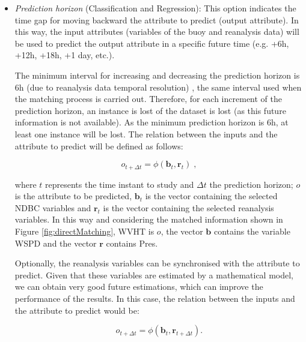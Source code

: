 \documentclass[energies,article,submit,moreauthors,pdftex]{Definitions/mdpi}
\begin{document}
					\begin{itemize}[leftmargin=*,labelsep=5.8mm]

						\item \textit{Prediction horizon} (Classification and Regression): This option indicates the time gap for moving backward the attribute to predict (output attribute). In this way, the input attributes (variables of the buoy and reanalysis data) will be used to predict the output attribute in a specific future time (e.g. +6h, +12h, +18h, +1 day, etc.).
						
						The minimum interval for increasing and decreasing the prediction horizon is $6$h (due to reanalysis data temporal resolution) \cite{DORADOMORENO2017428}, the same interval used when the matching process is carried out. Therefore, for each increment of the prediction horizon, an instance is lost of the dataset is lost (as this future information is not available). As the minimum prediction horizon is $6$h, at least one instance will be lost. The relation between the inputs and the attribute to predict will be defined as follows:
						\begin{linenomath*}
							\begin{equation}
								o_{t+\Delta t}=\phi(\mathbf{b}_t,\mathbf{r}_{t})\;,
								\label{eq:noSynchronisingRD}
							\end{equation}
						\end{linenomath*}
						where $t$ represents the time instant to study and $\Delta t$ the prediction horizon; $o$ is the attribute to be predicted, $\mathbf{b}_t$ is the vector containing the selected NDBC variables and $\mathbf{r}_t$ is the vector containing the selected reanalysis variables. In this way and considering the matched information shown in Figure \ref{fig:directMatching}, WVHT is $o$, the vector $\mathbf{b}$ contains the variable WSPD and the vector $\mathbf{r}$ contains Pres.
						
						Optionally, the reanalysis variables can be synchronised with the attribute to predict. Given that these variables are estimated by a mathematical model, we can obtain very good future estimations, which can improve the performance of the results. In this case, the relation between the inputs and the attribute to predict would be:						
						\begin{linenomath*}
							\begin{equation}
								o_{t+\Delta t}=\phi(\mathbf{b}_t,\mathbf{r}_{t+\Delta t}).
								\label{eq:synchronisingRD}
							\end{equation}
						\end{linenomath*}
						

\end{itemize}
\end{document}

